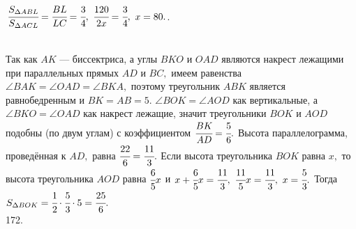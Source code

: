\documentclass[12pt]{article}
\begin{document}
$\cfrac{S_{\Delta ABL}}{S_{\Delta ACL}}=\cfrac{BL}{LC}=\cfrac{3}{4},\ \cfrac{120}{2x}=\cfrac{3}{4},\ x=80.$\newpage{}. \begin{figure}[ht!]
\end{figure}\\
Так как $AK$ --- биссектриса, а углы $BKO$ и $OAD$ являются накрест лежащими при параллельных прямых $AD$ и $BC,$ имеем равенства $\angle BAK=\angle OAD=\angle BKA,$ поэтому треугольник $ABK$ является равнобедренным и $BK=AB=5.$ $\angle BOK=\angle AOD$ как вертикальные, а $\angle BKO=\angle OAD$ как накрест лежащие, значит треугольники $BOK$ и $AOD$ подобны (по двум углам) с коэффициентом $\cfrac{BK}{AD}=\cfrac{5}{6}.$ Высота параллелограмма, проведённая к $AD,$ равна $\cfrac{22}{6}=\cfrac{11}{3}.$ Если высота треугольника $BOK$ равна $x,$ то высота треугольника $AOD$ равна $\cfrac{6}{5}x$ и $x+\cfrac{6}{5}x=\cfrac{11}{3},\ \cfrac{11}{5} x=\cfrac{11}{3},\ x=\cfrac{5}{3}.$ Тогда $S_{\Delta BOK}=\cfrac{1}{2}\cdot\cfrac{5}{3}\cdot5=\cfrac{25}{6}.$\\
172. \begin{figure}[ht!]
\end{figure}\\
\end{document}
